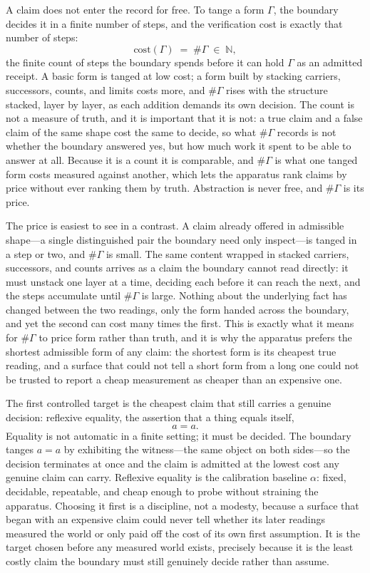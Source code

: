 A claim does not enter the record for free. To tange a form $\Gamma$, the boundary decides it in a finite number of steps, and the verification cost is exactly that number of steps:
\[
  \mathrm{cost}(\Gamma) \;=\; \#\Gamma \;\in\; \mathbb{N},
\]
the finite count of steps the boundary spends before it can hold $\Gamma$ as an admitted receipt. A basic form is tanged at low cost; a form built by stacking carriers, successors, counts, and limits costs more, and $\#\Gamma$ rises with the structure stacked, layer by layer, as each addition demands its own decision. The count is not a measure of truth, and it is important that it is not: a true claim and a false claim of the same shape cost the same to decide, so what $\#\Gamma$ records is not whether the boundary answered yes, but how much work it spent to be able to answer at all. Because it is a count it is comparable, and $\#\Gamma$ is what one tanged form costs measured against another, which lets the apparatus rank claims by price without ever ranking them by truth. Abstraction is never free, and $\#\Gamma$ is its price.

The price is easiest to see in a contrast. A claim already offered in admissible shape---a single distinguished pair the boundary need only inspect---is tanged in a step or two, and $\#\Gamma$ is small. The same content wrapped in stacked carriers, successors, and counts arrives as a claim the boundary cannot read directly: it must unstack one layer at a time, deciding each before it can reach the next, and the steps accumulate until $\#\Gamma$ is large. Nothing about the underlying fact has changed between the two readings, only the form handed across the boundary, and yet the second can cost many times the first. This is exactly what it means for $\#\Gamma$ to price form rather than truth, and it is why the apparatus prefers the shortest admissible form of any claim: the shortest form is its cheapest true reading, and a surface that could not tell a short form from a long one could not be trusted to report a cheap measurement as cheaper than an expensive one.

The first controlled target is the cheapest claim that still carries a genuine decision: reflexive equality, the assertion that a thing equals itself,
\[
  a = a.
\]
Equality is not automatic in a finite setting; it must be decided. The boundary tanges $a = a$ by exhibiting the witness---the same object on both sides---so the decision terminates at once and the claim is admitted at the lowest cost any genuine claim can carry. Reflexive equality is the calibration baseline $\alpha$: fixed, decidable, repeatable, and cheap enough to probe without straining the apparatus. Choosing it first is a discipline, not a modesty, because a surface that began with an expensive claim could never tell whether its later readings measured the world or only paid off the cost of its own first assumption. It is the target chosen before any measured world exists, precisely because it is the least costly claim the boundary must still genuinely decide rather than assume.


